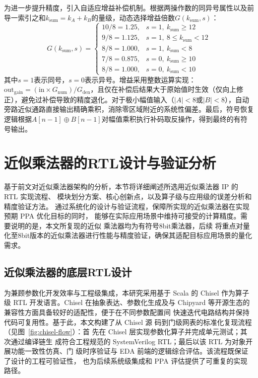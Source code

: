 \documentclass[12pt,a4paper,UTF8]{article}
\begin{document}
为进一步提升精度，引入自适应增益补偿机制。根据两操作数的同异号属性以及前导一索引之和$k_{\mathrm{sum}} = k_A + k_B$的量级，动态选择增益倍数$G(k_{\mathrm{sum}}, s)$：
\begin{equation}
G(k_{\mathrm{sum}}, s) =
\begin{cases}
10/8 = 1.25, & s = 1,\ k_{\mathrm{sum}} \geq 12 \\
9/8 = 1.125, & s = 1,\ 8 \leq k_{\mathrm{sum}} < 12 \\
8/8 = 1.000, & s = 1,\ k_{\mathrm{sum}} < 8 \\
7/8 = 0.875, & s = 0,\ k_{\mathrm{sum}} \geq 10 \\
8/8 = 1.000, & s = 0,\ k_{\mathrm{sum}} < 10
\end{cases}
\label{eq:gain}
\end{equation}
其中$s=1$表示同号，$s=0$表示异号。增益采用整数运算实现：$\mathrm{out}_{\mathrm{gain}} = (\mathrm{in} \times G_{\mathrm{num}}) / G_{\mathrm{den}}$，且仅在补偿后结果大于原始值时生效（仅向上修正），避免过补偿导致的精度退化。对于极小幅值输入（$|A|<8$或$|B|<8$），自动旁路近似通路直接输出精确乘积，消除零区域附近的系统性偏差。最后，符号恢复逻辑根据$A[n-1] \oplus B[n-1]$对幅值乘积执行补码取反操作，得到最终的有符号输出。


\clearpage

\section{近似乘法器的RTL设计与验证分析}

基于前文对近似乘法器架构的分析，本节将详细阐述所选用近似乘法器 IP 的 RTL 实现流程、
模块划分方案、核心创新点，以及算子级与应用级的误差分析和精度验证方法。
通过系统化的设计与验证流程，保障所实现的近似乘法器在实现预期 PPA 优化目标的同时，
能够在实际应用场景中维持可接受的计算精度。需要说明的是，本文所复现的近似
乘法器均为有符号8bit乘法器，后续
将重点对量化至8bit版本的近似乘法器进行性能与精度验证，确保其适配目标应用场景的量化需求。


\subsection{近似乘法器的底层RTL设计}

为兼顾参数化开发效率与工程级集成，本研究采用基于 Scala 的 Chisel 作为算子级 
RTL 开发语言。Chisel 在抽象表达、参数化生成及与 Chipyard 
等开源生态的兼容性方面具备较好的适配性，便于在不同参数配置间
快速迭代电路结构并保持代码可复用性。基于此，本文构建了从 Chisel 源
码到门级网表的标准化复现流程（见图~\ref{fig:chisel-flow}）：首
先在 Chisel 层实现参数化算子并完成单元测试；其次通过编译链生
成符合工程规范的 SystemVerilog RTL；最后以该 RTL 为对象开展功能一致性仿真、门
级时序验证与 EDA 前端的逻辑综合评估。该流程既保证了设计的工程可验证性，
也为后续系统级集成和 PPA 评估提供了可重复的实现路径。
\end{document}
